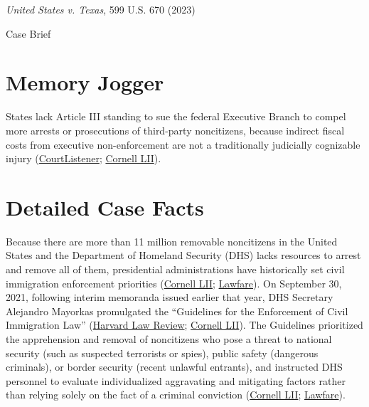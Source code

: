\documentclass[12pt]{article}
\begin{document}
\begin{center}
{\LARGE \textit{United States v. Texas}, 599 U.S. 670 (2023)\par}
\vspace{0.8em}
{\large Case Brief\par}
\end{center}
\vspace{1em}

\section{Memory Jogger}

States lack Article III standing to sue the federal Executive Branch to compel more arrests or prosecutions of third-party noncitizens, because indirect fiscal costs from executive non-enforcement are not a traditionally judicially cognizable injury (\href{https://www.courtlistener.com/opinion/10049663/united-states-v-texas/}{CourtListener}; \href{https://www.law.cornell.edu/supremecourt/text/22-58}{Cornell LII}).

\section{Detailed Case Facts}

Because there are more than 11 million removable noncitizens in the United States and the Department of Homeland Security (DHS) lacks resources to arrest and remove all of them, presidential administrations have historically set civil immigration enforcement priorities (\href{https://www.law.cornell.edu/supremecourt/text/22-58}{Cornell LII}; \href{https://www.lawfaremedia.org/article/united-states-v.-texas-explained}{Lawfare}). On September 30, 2021, following interim memoranda issued earlier that year, DHS Secretary Alejandro Mayorkas promulgated the ``Guidelines for the Enforcement of Civil Immigration Law'' (\href{https://harvardlawreview.org/print/vol-137/united-states-v-texas/}{Harvard Law Review}; \href{https://www.law.cornell.edu/supremecourt/text/22-58}{Cornell LII}). The Guidelines prioritized the apprehension and removal of noncitizens who pose a threat to national security (such as suspected terrorists or spies), public safety (dangerous criminals), or border security (recent unlawful entrants), and instructed DHS personnel to evaluate individualized aggravating and mitigating factors rather than relying solely on the fact of a criminal conviction (\href{https://www.law.cornell.edu/supremecourt/text/22-58}{Cornell LII}; \href{https://www.lawfaremedia.org/article/united-states-v.-texas-explained}{Lawfare}).
\end{document}
